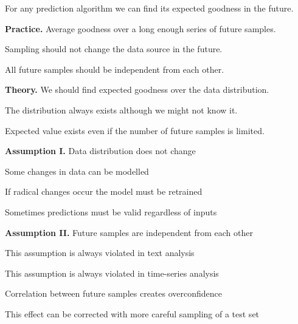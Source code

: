 \documentclass[landscape,footrule]{foils}
\begin{document}
\enlargethispage{1cm}

For any prediction algorithm we can find its expected goodness in the future.

\textbf{Practice.} Average goodness over a long enough series of future samples.

\begin{triangles}
\item Sampling should not change the data source in the future. 
\item All future samples should be independent from each other. 
\end{triangles} 
\vspace*{2ex}

\textbf{Theory.} We should find expected goodness over the data distribution.
\begin{triangles}
\item The distribution always exists although we might not know it.  
\item Expected value exists even if the number of future samples is limited.
\end{triangles} 
\bigskip




\textbf{Assumption I.} Data distribution does not change
\begin{triangles}
\item Some changes in data can be modelled
\item If radical changes occur the model must be retrained
\item Sometimes predictions must be valid regardless of inputs  \vspace*{1cm}
\end{triangles}

\textbf{Assumption II.} Future samples are independent from each other
\begin{triangles}
\item This assumption is always violated in text analysis
\item This assumption is always violated in time-series analysis
\item Correlation between future samples creates overconfidence
\item This effect can be corrected with more careful sampling of a test set
\end{triangles}
\end{document}
